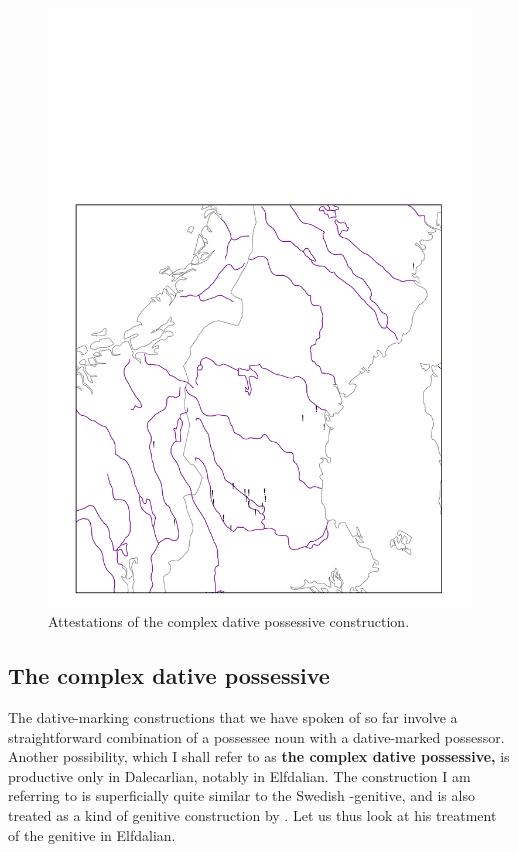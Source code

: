 \begin{figure}[h]
\includegraphics[height=.5\textheight]{figures/23_Attestationsofthecomplex}
\caption{Attestations of the complex dative possessive construction.}
\label{map:19}

\end{figure}

\subsection{The complex dative possessive}
\label{sec:5.4.2}

The dative-marking constructions that we have spoken of so far involve a straightforward combination of a possessee noun with a dative-marked possessor. Another possibility, which I shall refer to as \textbf{the complex dative possessive,} is productive only in Dalecarlian, notably in Elfdalian. The construction I am referring to is superficially quite similar to the Swedish -genitive, and is also treated as a kind of genitive construction by \citet{Levander1909}. Let us thus look at his treatment of the genitive in Elfdalian.

